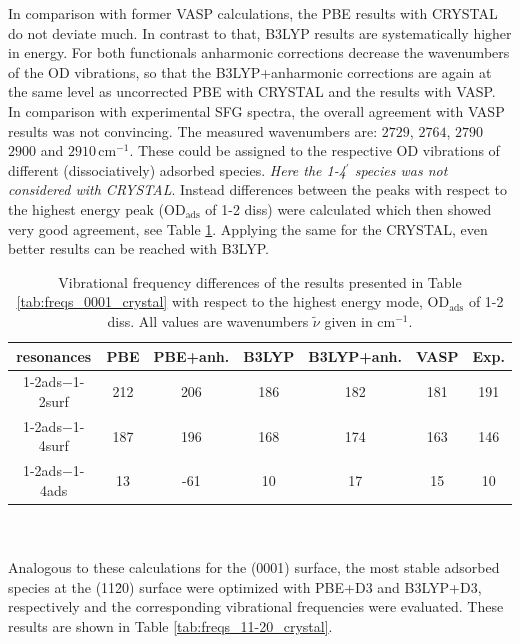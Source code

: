 \documentclass[11pt,DIV=13,BCOR=5mm,a4paper,headinclude]{scrbook}
\begin{document}
In comparison with former VASP calculations, the PBE results with CRYSTAL do not deviate much.
In contrast to that, B3LYP results are systematically higher in energy.
For both functionals anharmonic corrections decrease the wavenumbers of the OD vibrations, so that the B3LYP+anharmonic corrections are again at the same level as uncorrected PBE with CRYSTAL and the results with VASP.
In comparison with experimental SFG spectra\cite{Wirth2014}, the overall agreement with VASP results was not convincing.
The measured wavenumbers are: $2729$, $2764$, $2790$ $2900$ and $2910\,$cm$^{-1}$.
These could be assigned to the respective OD vibrations of different (dissociatively) adsorbed species.
\textit{Here the 1-4$^\prime$ species was not considered with CRYSTAL}.
Instead differences between the peaks with respect to the highest energy peak (OD$_\textrm{ads}$ of 1-2 diss) were calculated which then showed very good agreement, see Table \ref{tab:freqs_0001_crystal-relative}.
Applying the same for the CRYSTAL, even better results can be reached with B3LYP.
\begin{table}[!h]
  \centering
  \caption{Vibrational frequency differences of the results presented in Table \ref{tab:freqs_0001_crystal} with respect to the highest energy mode, OD$_\textrm{ads}$ of 1-2 diss.
All values are wavenumbers $\tilde{\nu}$ given in cm$^{-1}$.}
  \begin{tabular}{c|cc|cc|c|c}
  \toprule
   resonances& PBE & PBE+anh. & B3LYP & B3LYP+anh. &VASP&Exp.\\\midrule
  1-2ads$-$1-2surf&212 &206 &186 &182 &181 &191 \\
  1-2ads$-$1-4surf&187 &196 &168 &174 &163 &146 \\
  1-2ads$-$1-4ads &13 &-61 &10 &17 &15 &10 \\\bottomrule
    \end{tabular}
  \label{tab:freqs_0001_crystal-relative}
\end{table}
\\\\
Analogous to these calculations for the (0001) surface, the most stable adsorbed species at the (11\=20) surface were optimized with PBE+D3 and B3LYP+D3, respectively and the corresponding vibrational frequencies were evaluated.
These results are shown in Table \ref{tab:freqs_11-20_crystal}.
\end{document}
